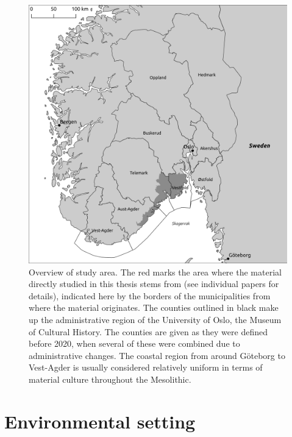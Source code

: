 \documentclass[
  12pt,
  a4paper,
  oneside]{book}
\begin{document}
\begin{figure}

{\centering \includegraphics[width=0.95\linewidth]{figures/overview} 

}

\caption{Overview of study area. The red marks the area where the material directly studied in this thesis stems from (see individual papers for details), indicated here by the borders of the municipalities from where the material originates. The counties outlined in black make up the administrative region of the University of Oslo, the Museum of Cultural History. The counties are given as they were defined before 2020, when several of these were combined due to administrative changes. The coastal region from around Göteborg to Vest-Agder is usually considered relatively uniform in terms of material culture throughout the Mesolithic.}\label{fig:overview}
\end{figure}

\hypertarget{environmental-setting}{%
\section{Environmental setting}\label{environmental-setting}}
\end{document}
